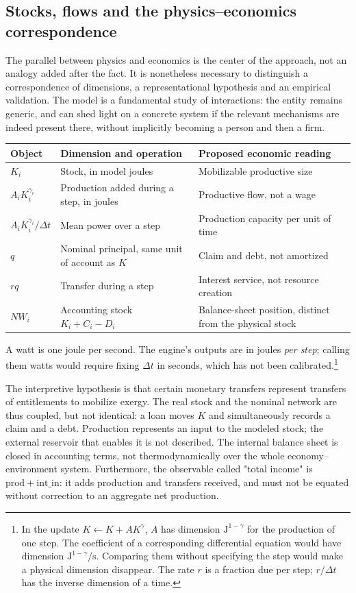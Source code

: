 \subsection{Stocks, flows and the physics--economics correspondence}
\label{sec:physique}
The parallel between physics and economics is the center of the
approach, not an analogy added after the fact. It is nonetheless
necessary to distinguish a correspondence of dimensions, a
representational hypothesis and an empirical validation.
The model is a fundamental study of interactions: the entity remains
generic, and can shed light on a concrete system if the relevant
mechanisms are indeed present there, without implicitly becoming a
person and then a firm.

\begin{center}
\begin{tabularx}{\linewidth}{@{}lXX@{}}
\toprule
Object & Dimension and operation & Proposed economic reading \\
\midrule
$K_i$ & Stock, in model joules & Mobilizable productive size \\
$A_iK_i^{\gamma_i}$ & Production added during a step, in joules & Productive flow, not a wage \\
$A_iK_i^{\gamma_i}/\Delta t$ & Mean power over a step & Production capacity per unit of time \\
$q$ & Nominal principal, same unit of account as $K$ & Claim and debt, not amortized \\
$rq$ & Transfer during a step & Interest service, not resource creation \\
$NW_i$ & Accounting stock $K_i+C_i-D_i$ & Balance-sheet position, distinct from the physical stock \\
\bottomrule
\end{tabularx}
\end{center}
A watt is one joule per second. The engine's outputs are in joules
\emph{per step}; calling them watts would require fixing $\Delta t$ in
seconds, which has not been calibrated.\footnote{In the update
$K\leftarrow K+A K^\gamma$, $A$ has dimension
$\mathrm{J}^{1-\gamma}$ for the production of one step. The
coefficient of a corresponding differential equation would have
dimension $\mathrm{J}^{1-\gamma}/\mathrm{s}$. Comparing them without
specifying the step would make a physical dimension disappear. The
rate $r$ is a fraction due per step; $r/\Delta t$ has the inverse
dimension of a time.}

The interpretive hypothesis is that certain monetary transfers
represent transfers of entitlements to mobilize exergy. The real stock
and the nominal network are thus coupled, but not identical: a loan
moves $K$ and simultaneously records a claim and a debt. Production
represents an input to the modeled stock; the external reservoir that
enables it is not described. The internal balance sheet is closed in
accounting terms, not thermodynamically over the whole
economy--environment system. Furthermore, the observable called
"total income" is $\mathrm{prod}+\mathrm{int\_in}$: it adds
production and transfers received, and must not be equated without
correction to an aggregate net production.

